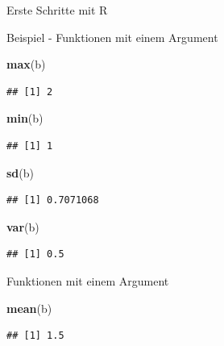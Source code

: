 \documentclass[ignorenonframetext,]{beamer}
\newenvironment{Shaded}{}{}
\newcommand{\KeywordTok}[1]{\textcolor[rgb]{0.00,0.44,0.13}{\textbf{{#1}}}}
\newcommand{\NormalTok}[1]{{#1}}
\begin{document}
\begin{frame}[fragile]{Erste Schritte mit R}
\begin{block}{Beispiel - Funktionen mit einem Argument}

\begin{Shaded}
\begin{Highlighting}[]
\KeywordTok{max}\NormalTok{(b)}
\end{Highlighting}
\end{Shaded}

\begin{verbatim}
## [1] 2
\end{verbatim}

\begin{Shaded}
\begin{Highlighting}[]
\KeywordTok{min}\NormalTok{(b)}
\end{Highlighting}
\end{Shaded}

\begin{verbatim}
## [1] 1
\end{verbatim}

\begin{Shaded}
\begin{Highlighting}[]
\KeywordTok{sd}\NormalTok{(b)}
\end{Highlighting}
\end{Shaded}

\begin{verbatim}
## [1] 0.7071068
\end{verbatim}

\begin{Shaded}
\begin{Highlighting}[]
\KeywordTok{var}\NormalTok{(b)}
\end{Highlighting}
\end{Shaded}

\begin{verbatim}
## [1] 0.5
\end{verbatim}

\end{block}

\begin{block}{Funktionen mit einem Argument}

\begin{Shaded}
\begin{Highlighting}[]
\KeywordTok{mean}\NormalTok{(b)}
\end{Highlighting}
\end{Shaded}

\begin{verbatim}
## [1] 1.5
\end{verbatim}


\end{block}
\end{frame}
\end{document}
